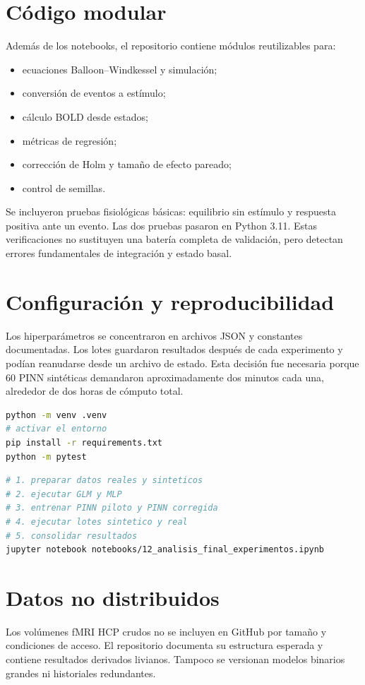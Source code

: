 \section{Código modular}
Además de los notebooks, el repositorio contiene módulos reutilizables para:
\begin{itemize}
  \item ecuaciones Balloon--Windkessel y simulación;
  \item conversión de eventos a estímulo;
  \item cálculo BOLD desde estados;
  \item métricas de regresión;
  \item corrección de Holm y tamaño de efecto pareado;
  \item control de semillas.
\end{itemize}

Se incluyeron pruebas fisiológicas básicas: equilibrio sin estímulo y respuesta positiva ante un evento. Las dos pruebas pasaron en Python 3.11. Estas verificaciones no sustituyen una batería completa de validación, pero detectan errores fundamentales de integración y estado basal.

\section{Configuración y reproducibilidad}
Los hiperparámetros se concentraron en archivos JSON y constantes documentadas. Los lotes guardaron resultados después de cada experimento y podían reanudarse desde un archivo de estado. Esta decisión fue necesaria porque 60 PINN sintéticas demandaron aproximadamente dos minutos cada una, alrededor de dos horas de cómputo total.

\begin{lstlisting}[language=bash,caption={Comandos mínimos para instalar y verificar el repositorio.}]
python -m venv .venv
# activar el entorno
pip install -r requirements.txt
python -m pytest
\end{lstlisting}

\begin{lstlisting}[language=bash,caption={Orden conceptual de ejecución.}]
# 1. preparar datos reales y sinteticos
# 2. ejecutar GLM y MLP
# 3. entrenar PINN piloto y PINN corregida
# 4. ejecutar lotes sintetico y real
# 5. consolidar resultados
jupyter notebook notebooks/12_analisis_final_experimentos.ipynb
\end{lstlisting}

\section{Datos no distribuidos}
Los volúmenes fMRI HCP crudos no se incluyen en GitHub por tamaño y condiciones de acceso. El repositorio documenta su estructura esperada y contiene resultados derivados livianos. Tampoco se versionan modelos binarios grandes ni historiales redundantes.

